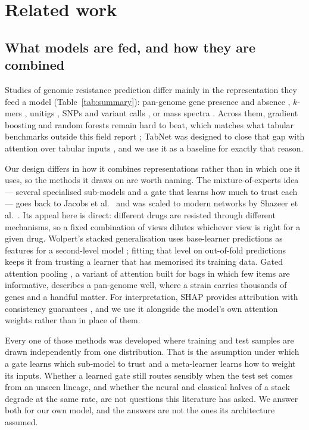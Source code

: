 \section*{Related work}

\subsection*{What models are fed, and how they are combined}
Studies of genomic resistance prediction differ mainly in the representation they feed a model
(Table~\ref{tab:summary}): pan-genome gene presence and absence
\cite{moradigaravand2018prediction,her2018pangenome}, $k$-mers \cite{jain2025paeruginosa,
gao2024abaumannii,serajian2024mtb}, unitigs \cite{do2024unitig}, SNPs and variant calls
\cite{wang2025hpylori,paredes2025mtb}, or mass spectra \cite{lopezcortes2024msdeepamr}. Across them,
gradient boosting and random forests remain hard to beat, which matches what tabular benchmarks
outside this field report \cite{grinsztajn2022trees,shwartzziv2022tabular}; TabNet was designed to
close that gap with attention over tabular inputs \cite{arik2021tabnet}, and we use it as a
baseline for exactly that reason.

Our design differs in how it combines representations rather than in which one it uses, so the
methods it draws on are worth naming. The mixture-of-experts idea --- several specialised
sub-models and a gate that learns how much to trust each --- goes back to Jacobs et al.\
\cite{jacobs1991moe} and was scaled to modern networks by Shazeer et al.\ \cite{shazeer2017moe}.
Its appeal here is direct: different drugs are resisted through different mechanisms, so a fixed
combination of views dilutes whichever view is right for a given drug. Wolpert's stacked
generalisation uses base-learner predictions as features for a second-level model
\cite{wolpert1992stacked}; fitting that level on out-of-fold predictions keeps it from trusting a
learner that has memorised its training data. Gated attention pooling \cite{ilse2018attention}, a
variant of attention \cite{vaswani2017attention} built for bags in which few items are informative,
describes a pan-genome well, where a strain carries thousands of genes and a handful matter. For
interpretation, SHAP provides attribution with consistency guarantees \cite{lundberg2017shap}, and
we use it alongside the model's own attention weights rather than in place of them.

Every one of those methods was developed where training and test samples are drawn independently
from one distribution. That is the assumption under which a gate learns which sub-model to trust
and a meta-learner learns how to weight its inputs. Whether a learned gate still routes sensibly
when the test set comes from an unseen lineage, and whether the neural and classical halves of a
stack degrade at the same rate, are not questions this literature has asked. We answer both for our
own model, and the answers are not the ones its architecture assumed.

